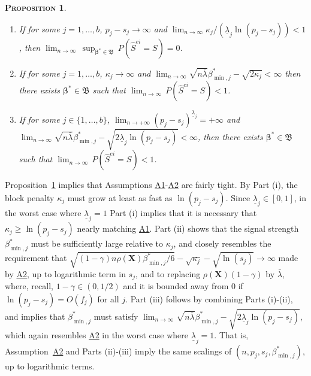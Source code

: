\documentclass[
  12pt]{article}
\providecommand{\tightlist}{%
  \setlength{\itemsep}{0pt}\setlength{\parskip}{0pt}}\usepackage{longtable,booktabs,array}
\newcommand{\bbeta}{\boldsymbol{\beta}}
\newcommand{\bX}{\mathbf{X}}
\newtheorem{prop}[thm]{\textsc{Proposition}}
\begin{document}
\begin{prop}\label{prop:nectypeItypeII}
 \begin{enumerate}[label=(\roman*)]\tightlist
    \item If for some $j=1,\ldots,b$, $p_j-s_j\to\infty$ and $\lim_{n\to\infty}\kappa_j/(\underline{\lambda}_j\ln(p_j-s_j)) <1$, then 
     $\lim_{n \to \infty} \, \sup_{\bbeta^*\in\mathfrak{B}}\, P(\hat{S}^{ei}=S)= 0$.
    \item If for some $j=1,\ldots,b$, $\kappa_j\to\infty$  and
      $\lim_{n\to \infty}\sqrt{n\bar{\lambda}}\beta_{\min,j}^*-\sqrt{2\kappa_j} < \infty$ then there exists $\bbeta^*\in\mathfrak{B}$ such that $\lim_{n \to \infty} \, P(\hat{S}^{ei} = S) < 1$.
    \item If for some $j\in\{1,\ldots,b\}$,   $\lim_{n\to+\infty}(p_j-s_j)^{\underline{\lambda}_j}=+\infty$ and $\lim_{n\to\infty}\sqrt{n\bar{\lambda}}\beta_{\min,j}^*-\sqrt{2\underline{\lambda}_j\ln(p_j-s_j)} < \infty$, then there exists $\bbeta^*\in\mathfrak{B}$ such that $\lim_{n \to \infty} \,P(\hat{S}^{ei}=S) < 1$.
\end{enumerate}
\end{prop}

Proposition~\ref{prop:nectypeItypeII} implies that Assumptions \hyperlink{lab:A1}{A1}-\hyperlink{lab:A2}{A2} are fairly tight. By Part (i), the block penalty $\kappa_j$ must grow at least as fast as $\ln(p_j-s_j)$.
Since $\underline{\lambda}_j \in [0,1]$, in the worst case where $\underline{\lambda}_j=1$ Part (i) implies that it is necessary that 
$\kappa_j \geq \ln(p_j-s_j)$ 
nearly matching \hyperlink{lab:A1}{A1}. 
Part (ii) shows that the signal strength $\beta_{\min,j}^*$ must be sufficiently large relative to $\kappa_j$, and closely resembles the requirement that $\sqrt{(1-\gamma) n \rho(\bX) \beta_{\min,j}^*/6} - \sqrt{\kappa_j} - \sqrt{\ln(s_j)} \to \infty$ made by \hyperlink{lab:A2}{A2},
up to logarithmic term in $s_j$, and to replacing $\rho(\bX) (1 - \gamma)$ by $\bar{\lambda}$, where, recall, $1-\gamma \in (0,1/2)$ and it is bounded away from 0 if $\ln(p_j-s_j)=O(f_j)$ for all $j$.
Part (iii) follows by combining Parts (i)-(ii), and implies that $\beta_{\min,j}^*$ must satisfy
$\lim_{n\to\infty}\sqrt{n\bar{\lambda}}\beta_{\min,j}^*-\sqrt{ 2\underline{\lambda}_j\ln(p_j-s_j)}$,
which again resembles \hyperlink{lab:A2}{A2} in the worst case where $\underline{\lambda}_j=1$.
That is, Assumption~\hyperlink{lab:A2}{A2} and Parts (ii)-(iii) imply the same scalings of $(n,p_j,s_j,\beta_{\min,j}^*)$, up to logarithmic terms.
\end{document}
